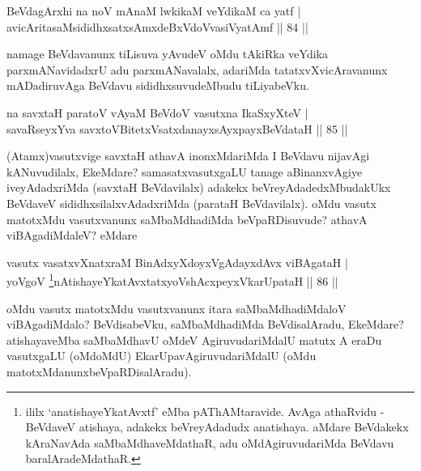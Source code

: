 
\begin{shl}
BeVdagArxhi na noV mAnaM lwkikaM veYdikaM ca yatf  | \\
avicAritasaMsididhxsatxsAmxdeBxVdoV\s vasiVyatAmf \hfill||  84 ||  
\end{shl}

\begin{artha}
namage BeVdavanunx tiLisuva yAvudeV oMdu tAkiRka veYdika parxmANavidadxrU adu parxmANavalalx, adariMda tatatxvXvicAravanunx mADadiruvAga BeVdavu sididhxsuvudeMbudu tiLiyabeVku.
\end{artha}

\begin{shl}
na savxtaH paratoV vA\s yaM BeVdoV vasutxna IkaSxyXteV  | \\
savaRseyxYva savxtoV\s BitetxVsatxdanayxsAyxpayxBeVdataH \hfill||  85 ||  
\end{shl}

\begin{artha}
(Atamx)vasutxvige savxtaH athavA inonxMdariMda I BeVdavu nijavAgi kANuvudilalx, EkeMdare? samasatxvasutxgaLU tanage aBinanxvAgiye iveyAdadxriMda (savxtaH BeVdavilalx) adakekx beVreyAdadedxMbudakUkx BeVdaveV sididhxsilalxvAdadxriMda (parataH BeVdavilalx). oMdu vasutx matotxMdu vasutxvanunx saMbaMdhadiMda beVpaRDisuvude? athavA viBAgadiMdaleV? eMdare 
\end{artha}


\begin{shl}
vasutx vasatxvXnatxraM BinAdxyXdoyxVgAdayxdAvx viBAgataH  | \\
yoVgoV \footnote{ililx `anatishayeYkatAvxtf' eMba pAThAMtaravide. AvAga athaRvidu - BeVdaveV atishaya, adakekx beVreyAdadudx anatishaya. aMdare BeVdakekx kAraNavAda saMbaMdhaveMdathaR, adu oMdAgiruvudariMda BeVdavu baralAradeMdathaR.}nAtishayeYkatAvxtatxyoVshAcxpeyxVkarUpataH \hfill||  86 ||  
\end{shl}

\begin{artha}
oMdu vasutx matotxMdu vasutxvanunx itara saMbaMdhadiMdaloV viBAgadiMdalo? BeVdisabeVku, saMbaMdhadiMda BeVdisalAradu, EkeMdare? atishayaveMba saMbaMdhavU oMdeV AgiruvudariMdalU matutx A eraDu vasutxgaLU (oMdoMdU) EkarUpavAgiruvudariMdalU (oMdu matotxMdanunx\break beVpaRDisalAradu).
\end{artha}


